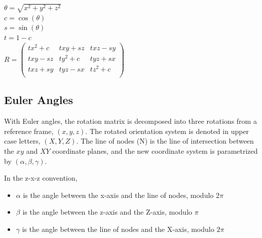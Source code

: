 \documentclass[12pt,a4,notitlepage]{report}
\renewcommand{\_}{\texttt{\symbol{95}}}
\newcommand{\<}{\texttt{\symbol{60}}}
\renewcommand{\>}{\texttt{\symbol{62}}}
\begin{document}
$\theta = \sqrt{x^2 + y^2 + z^2}$\\

$c = \cos(\theta)$\\
$s = \sin(\theta)$\\
$t = 1-c $\\

$R =
\left( \begin{array}{ccc}
      tx^2+c & txy+sz & txz-sy\\
		txy-sz & ty^2+c & tyz+sx\\
		txz+sy & tyz-sx & tz^2+c\\
\end{array} \right)$

\subsection{Euler Angles}

With Euler angles, the rotation matrix is decomposed into three rotations from a reference frame, $(x,y,z)$. The rotated orientation system is denoted in upper case letters, $(X,Y,Z)$. The line of nodes (N) is the line of intersection between the $xy$ and $XY$ coordinate planes, and the new coordinate system is parametrized by $(\alpha,\beta,\gamma)$.

In the z-x-z convention,

\begin{itemize}
\item $\alpha$ is the angle between the x-axis and the line of nodes, modulo $2\pi$
\item $\beta$ is the angle between the z-axis and the Z-axis, modulo $\pi$
\item $\gamma$ is the angle between the line of nodes and the X-axis, modulo $2\pi$
\end{itemize}
\end{document}
